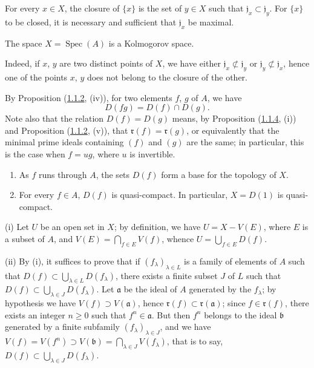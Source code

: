 \begin{corollary}[1.1.7]
\label{I.1.1.7}
For every $x\in X$, the closure of $\{x\}$ is the set of $y\in X$ such
that $\mathfrak{j}_x\subset\mathfrak{j}_y$. For $\{x\}$ to be closed, it is
necessary and sufficient that $\mathfrak{j}_x$ be maximal.
\end{corollary}

\begin{corollary}[1.1.8]
\label{I.1.1.8}
The space $X=\operatorname{Spec}(A)$ is a Kolmogorov space.
\end{corollary}

Indeed, if $x$, $y$ are two distinct points of $X$, we have either
$\mathfrak{j}_x\not\subset\mathfrak{j}_y$ or
$\mathfrak{j}_y\not\subset\mathfrak{j}_x$, hence one of the points $x$, $y$
does not belong to the closure of the other.

\begin{env}[1.1.9]
\label{I.1.1.9}
By Proposition (\hyperref[I.1.1.2]{1.1.2}, (iv)), for two elements
$f$, $g$ of $A$, we have
\begin{equation}
  D(fg)=D(f)\cap D(g).
  \tag{1.1.9.1}\label{I.1.1.9.1}
\end{equation}
Note also that the relation $D(f)=D(g)$ means, by Proposition
(\hyperref[I.1.1.4]{1.1.4}, (i)) and Proposition
(\hyperref[I.1.1.2]{1.1.2}, (v)), that
$\mathfrak{r}(f)=\mathfrak{r}(g)$, or equivalently that the minimal prime
ideals containing $(f)$ and $(g)$ are the same; in particular, this is the
case when $f=ug$, where $u$ is invertible.
\end{env}

\begin{proposition}[1.1.10]
\label{I.1.1.10}
\begin{enumerate}
  \item[\rm(i)] As $f$ runs through $A$, the sets $D(f)$ form a
  base for the topology of $X$.
  \item[\rm(ii)] For every $f\in A$, $D(f)$ is quasi-compact. In particular,
  $X=D(1)$ is quasi-compact.
\end{enumerate}
\end{proposition}

(i) Let $U$ be an open set in $X$; by definition, we have
$U=X-V(E)$, where $E$ is a subset of $A$, and
$V(E)=\bigcap_{f\in E}V(f)$, whence $U=\bigcup_{f\in E}D(f)$.

(ii) By (i), it suffices to prove that if $(f_\lambda)_{\lambda\in L}$
is a family of elements of $A$ such that
$D(f)\subset\bigcup_{\lambda\in L}D(f_\lambda)$, there exists a finite subset
$J$ of $L$ such that $D(f)\subset\bigcup_{\lambda\in J}D(f_\lambda)$. Let
$\mathfrak{a}$ be the ideal of $A$ generated by the $f_\lambda$; by
hypothesis we have $V(f)\supset V(\mathfrak{a})$, hence
$\mathfrak{r}(f)\subset\mathfrak{r}(\mathfrak{a})$; since
$f\in\mathfrak{r}(f)$, there exists an integer $n\geq0$ such that
$f^n\in\mathfrak{a}$. But then $f^n$ belongs to the ideal $\mathfrak{b}$
generated by a finite subfamily $(f_\lambda)_{\lambda\in J}$, and we have
$V(f)=V(f^n)\supset V(\mathfrak{b})=\bigcap_{\lambda\in J}V(f_\lambda)$,
that is to say, $D(f)\subset\bigcup_{\lambda\in J}D(f_\lambda)$.


